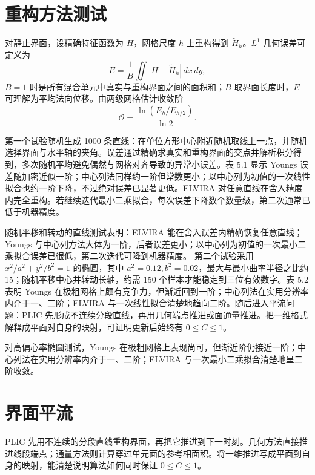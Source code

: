 \documentclass[11pt,a4paper,openany,fontset=none]{ctexbook}
\begin{document}
\section{重构方法测试}

对静止界面，设精确特征函数为 $H$，网格尺度 $h$ 上重构得到 $\widetilde H_h$。$L^1$ 几何误差可定义为
\begin{equation}
E=\frac1B\iint|H-\widetilde H_h|\,dx\,dy,
\tag{5.23}
\end{equation}
$B=1$ 时是所有混合单元中真实与重构界面之间的面积和；$B$ 取界面长度时，$E$ 可理解为平均法向位移。由两级网格估计收敛阶
\begin{equation}
\mathcal O=\frac{\ln(E_h/E_{h/2})}{\ln 2}.
\tag{5.24}
\end{equation}

第一个试验随机生成 1000 条直线：在单位方形中心附近随机取线上一点，并随机选择界面与水平轴的夹角。误差通过精确求真实和重构界面的交点并解析积分得到，多次随机平均避免偶然与网格对齐导致的异常小误差。表 5.1 显示 Youngs 误差随加密近似一阶；中心列法同样约一阶但常数更小；以中心列为初值的一次线性拟合也约一阶下降，不过绝对误差已显著更低。ELVIRA 对任意直线在舍入精度内完全重构。若继续迭代最小二乘拟合，每次误差下降数个数量级，第二次通常已低于机器精度。

随机平移和转动的直线测试表明：ELVIRA 能在舍入误差内精确恢复任意直线；Youngs 与中心列方法大体为一阶，后者误差更小；以中心列为初值的一次最小二乘拟合误差已很低，第二次迭代可降到机器精度。%
第二个试验采用 $x^2/a^2+y^2/b^2=1$ 的椭圆，其中 $a^2=0.12,b^2=0.02$，最大与最小曲率半径之比约 15；随机平移中心并转动长轴，约需 150 个样本才能稳定到三位有效数字。表 5.2 表明 Youngs 在极粗网格上颇有竞争力，但渐近回到一阶；中心列法在实用分辨率内介于一、二阶；ELVIRA 与一次线性拟合清楚地趋向二阶。随后进入平流问题：PLIC 先形成不连续分段直线，再用几何端点推进或面通量推进。把一维格式解释成平面对自身的映射，可证明更新后始终有 $0\le C\le1$。

对高偏心率椭圆测试，Youngs 在极粗网格上表现尚可，但渐近阶仍接近一阶；中心列法在实用分辨率内介于一、二阶；ELVIRA 与一次最小二乘拟合清楚地呈二阶收敛。

\section{界面平流}

PLIC 先用不连续的分段直线重构界面，再把它推进到下一时刻。几何方法直接推进线段端点；通量方法则计算穿过单元面的参考相面积。将一维推进写成平面到自身的映射，能清楚说明算法如何同时保证 $0\leq C\leq1$。
\end{document}
